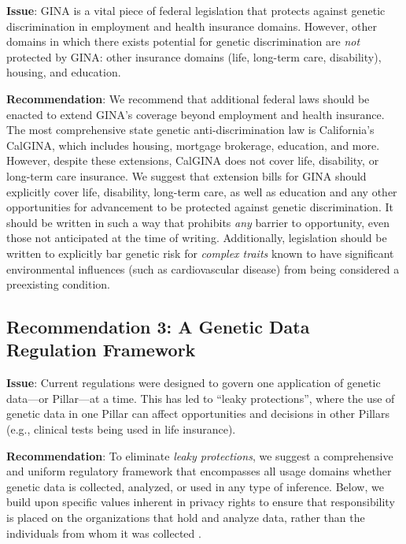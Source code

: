 \textbf{Issue}: GINA is a vital piece of federal legislation that protects against genetic discrimination in employment and health insurance domains. However, other domains in which there exists potential for genetic discrimination  are \textit{not} protected by GINA: other insurance domains (life, long-term care, disability), housing, and education. 

\textbf{Recommendation}: We recommend that additional federal laws should be enacted to extend GINA's coverage beyond employment and health insurance. The most comprehensive state genetic anti-discrimination law is California's CalGINA, which includes housing, mortgage brokerage, education, and more.  However, despite these extensions, CalGINA does not cover life, disability, or long-term care insurance. We suggest that extension bills for GINA should explicitly cover life, disability, long-term care, as well as education and any other opportunities for advancement to be protected against genetic discrimination. It should be written in such a way that prohibits \textit{any} barrier to opportunity, even those not anticipated at the time of writing. Additionally, legislation should be written to explicitly bar genetic risk for \emph{complex traits} known to have significant environmental influences (such as cardiovascular disease) from being considered a preexisting condition.


\subsection{Recommendation 3: A Genetic Data Regulation Framework}

\textbf{Issue}: Current regulations were designed to govern one application of genetic data—or Pillar—at a time. This has led to ``leaky protections'', where the use of genetic data in one Pillar can affect opportunities and decisions in other Pillars (e.g., clinical tests being used in life insurance).

\textbf{Recommendation}: To eliminate \emph{leaky protections}, we suggest a comprehensive and uniform regulatory framework that encompasses all usage domains whether genetic data is collected, analyzed, or used in any type of inference. Below, we build upon specific values inherent in privacy rights to ensure that responsibility is placed on the organizations that hold and analyze data, rather than the individuals from whom it was collected \cite{solove_limitations_2022}. 

